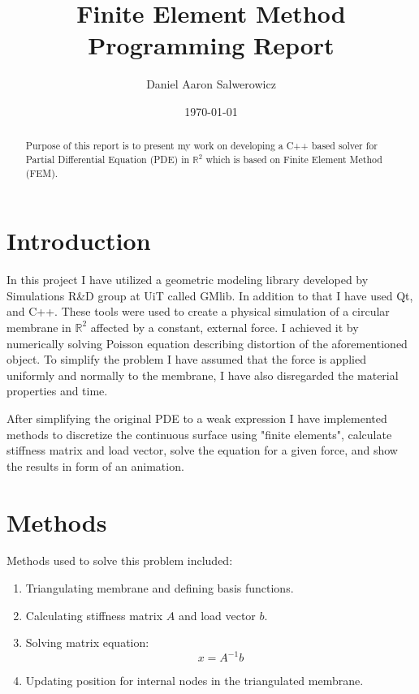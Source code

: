 \documentclass[a4,10pt]{article}
\title{Finite Element Method Programming Report}
\author{Daniel Aaron Salwerowicz}
\date{\today}
\begin{document}
  
\maketitle

\begin{abstract}
  Purpose of this report is to present my work on developing a C++ based solver for Partial Differential Equation (PDE) in $\mathbb{R}^2$ which is based on Finite Element Method (FEM). 
\end{abstract}


\section{Introduction}
In this project I have utilized a geometric modeling library developed by Simulations R\&D group at UiT called GMlib. In addition to that I have used Qt, and C++. These tools were used to create a physical simulation of a circular membrane in $\mathbb{R}^2$ affected by a constant, external force. I achieved it by numerically solving Poisson equation describing distortion of the aforementioned object. To simplify the problem I have assumed that the force is applied uniformly and normally to the membrane, I have also disregarded the material properties and time.

After simplifying the original PDE to a weak expression I have implemented methods to discretize the continuous surface using "finite elements", calculate stiffness matrix and load vector, solve the equation for a given force, and show the results in form of an animation.

\section{Methods}
Methods used to solve this problem included:
\begin{enumerate}
  \item Triangulating membrane and defining basis functions.
  \item Calculating stiffness matrix $A$ and load vector $b$.
  \item Solving matrix equation:
  \begin{equation} \label{MatrixEquation}
  x=A^{-1}b
  \end{equation}
  \item Updating position for internal nodes in the triangulated membrane.   
\end{enumerate}
\end{document}
